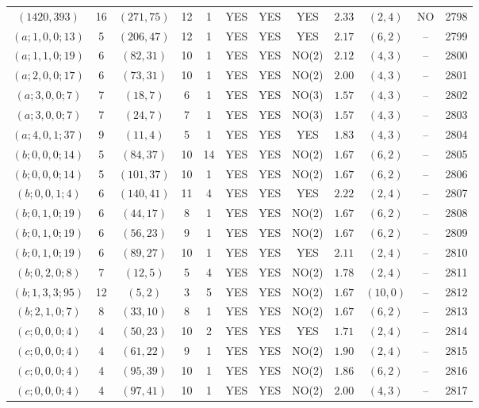 \begin{longtable}{|c|c|c|c|c|c|c|c|c|c|c|c|}
$(1420,393)$ & 16 & $(271,75)$ & 12 & 1 & YES & YES & YES & $2.33$ & $(2,4)$ & NO & 2798\\
$(a;1,0,0;13)$ & 5 & $(206,47)$ & 12 & 1 & YES & YES & YES & $2.17$ & $(6,2)$ & -- & 2799\\
$(a;1,1,0;19)$ & 6 & $(82,31)$ & 10 & 1 & YES & YES & NO(2) & $2.12$ & $(4,3)$ & -- & 2800\\
$(a;2,0,0;17)$ & 6 & $(73,31)$ & 10 & 1 & YES & YES & NO(2) & $2.00$ & $(4,3)$ & -- & 2801\\
$(a;3,0,0;7)$ & 7 & $(18,7)$ & 6 & 1 & YES & YES & NO(3) & $1.57$ & $(4,3)$ & -- & 2802\\
$(a;3,0,0;7)$ & 7 & $(24,7)$ & 7 & 1 & YES & YES & NO(3) & $1.57$ & $(4,3)$ & -- & 2803\\
$(a;4,0,1;37)$ & 9 & $(11,4)$ & 5 & 1 & YES & YES & YES & $1.83$ & $(4,3)$ & -- & 2804\\
$(b;0,0,0;14)$ & 5 & $(84,37)$ & 10 & 14 & YES & YES & NO(2) & $1.67$ & $(6,2)$ & -- & 2805\\
$(b;0,0,0;14)$ & 5 & $(101,37)$ & 10 & 1 & YES & YES & NO(2) & $1.67$ & $(6,2)$ & -- & 2806\\
$(b;0,0,1;4)$ & 6 & $(140,41)$ & 11 & 4 & YES & YES & YES & $2.22$ & $(2,4)$ & -- & 2807\\
$(b;0,1,0;19)$ & 6 & $(44,17)$ & 8 & 1 & YES & YES & NO(2) & $1.67$ & $(6,2)$ & -- & 2808\\
$(b;0,1,0;19)$ & 6 & $(56,23)$ & 9 & 1 & YES & YES & NO(2) & $1.67$ & $(6,2)$ & -- & 2809\\
$(b;0,1,0;19)$ & 6 & $(89,27)$ & 10 & 1 & YES & YES & YES & $2.11$ & $(2,4)$ & -- & 2810\\
$(b;0,2,0;8)$ & 7 & $(12,5)$ & 5 & 4 & YES & YES & NO(2) & $1.78$ & $(2,4)$ & -- & 2811\\
$(b;1,3,3;95)$ & 12 & $(5,2)$ & 3 & 5 & YES & YES & NO(2) & $1.67$ & $(10,0)$ & -- & 2812\\
$(b;2,1,0;7)$ & 8 & $(33,10)$ & 8 & 1 & YES & YES & NO(2) & $1.67$ & $(6,2)$ & -- & 2813\\
$(c;0,0,0;4)$ & 4 & $(50,23)$ & 10 & 2 & YES & YES & YES & $1.71$ & $(2,4)$ & -- & 2814\\
$(c;0,0,0;4)$ & 4 & $(61,22)$ & 9 & 1 & YES & YES & NO(2) & $1.90$ & $(2,4)$ & -- & 2815\\
$(c;0,0,0;4)$ & 4 & $(95,39)$ & 10 & 1 & YES & YES & NO(2) & $1.86$ & $(6,2)$ & -- & 2816\\
$(c;0,0,0;4)$ & 4 & $(97,41)$ & 10 & 1 & YES & YES & NO(2) & $2.00$ & $(4,3)$ & -- & 2817\\

\end{longtable}
